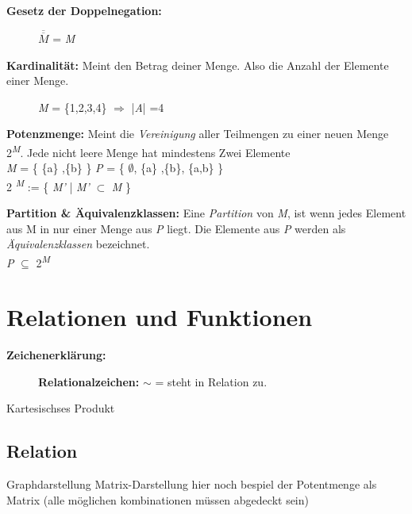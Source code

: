 \textbf{Gesetz der Doppelnegation:}\\
\begin{figure}[H]
\centering
$\overline{\overline{M}}$ = \textit{M}
\end{figure}


\textbf{Kardinalität:} Meint den Betrag deiner Menge. Also die Anzahl der Elemente einer Menge.\\
\begin{figure}[H]
\centering
\textit{M} = \{1,2,3,4\}  $\Rightarrow$ |\textit{A}| =4\\
\end{figure}

\textbf{Potenzmenge:} Meint die \textit{Vereinigung} aller Teilmengen zu einer neuen Menge 2\textsuperscript{\textit{M}}. Jede nicht leere Menge hat mindestens Zwei Elemente\\

\textit{M} = \{ \{a\}  ,\{b\} \}
\textit{P} = \{ $\emptyset$, \{a\}  ,\{b\}, \{a,b\} \}\\
2\textsuperscript{ \textit{M}} := \{ \textit{M'} | \textit{M'} $\subset$ \textit{M} \}


\textbf{Partition \& Äquivalenzklassen:} Eine \textit{Partition} von \textit{M}, ist wenn jedes Element aus M in nur einer Menge aus \textit{P} liegt. Die Elemente aus \textit{P} werden als \textit{Äquivalenzklassen} bezeichnet.\\
\textit{P} $\subseteq$ 2\textsuperscript{\textit{M}}

\section{Relationen und Funktionen}

\textbf{Zeichenerklärung:}\\
\begin{figure}[h]
\centering
\textbf{Relationalzeichen:} \textit{$\sim$} = steht in Relation zu.\\
\end{figure}

Kartesischses Produkt

\subsection{Relation}

Graphdarstellung
Matrix-Darstellung hier noch bespiel der Potentmenge als Matrix (alle möglichen kombinationen müssen abgedeckt sein)\\


